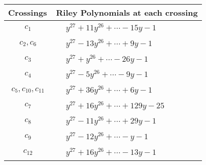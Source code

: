 \documentclass[1p]{elsarticle_modified}
\theoremstyle{definition}
\begin{document}
\begin{tabular}{m{50pt}|m{274pt}}
Crossings & \hspace{64pt}Riley Polynomials at each crossing \\
\hline $$\begin{aligned}c_{1}\end{aligned}$$&$\begin{aligned}
&y^{27}+11 y^{26}+\cdots-15 y-1
\end{aligned}$\\
\hline $$\begin{aligned}c_{2},c_{6}\end{aligned}$$&$\begin{aligned}
&y^{27}-13 y^{26}+\cdots+9 y-1
\end{aligned}$\\
\hline $$\begin{aligned}c_{3}\end{aligned}$$&$\begin{aligned}
&y^{27}+y^{26}+\cdots-26 y-1
\end{aligned}$\\
\hline $$\begin{aligned}c_{4}\end{aligned}$$&$\begin{aligned}
&y^{27}-5 y^{26}+\cdots-9 y-1
\end{aligned}$\\
\hline $$\begin{aligned}c_{5},c_{10},c_{11}\end{aligned}$$&$\begin{aligned}
&y^{27}+36 y^{26}+\cdots+6 y-1
\end{aligned}$\\
\hline $$\begin{aligned}c_{7}\end{aligned}$$&$\begin{aligned}
&y^{27}+16 y^{26}+\cdots+129 y-25
\end{aligned}$\\
\hline $$\begin{aligned}c_{8}\end{aligned}$$&$\begin{aligned}
&y^{27}-11 y^{26}+\cdots+29 y-1
\end{aligned}$\\
\hline $$\begin{aligned}c_{9}\end{aligned}$$&$\begin{aligned}
&y^{27}-12 y^{26}+\cdots- y-1
\end{aligned}$\\
\hline $$\begin{aligned}c_{12}\end{aligned}$$&$\begin{aligned}
&y^{27}+16 y^{26}+\cdots-13 y-1
\end{aligned}$\\
\hline
\end{tabular}\\~\\
\end{document}
